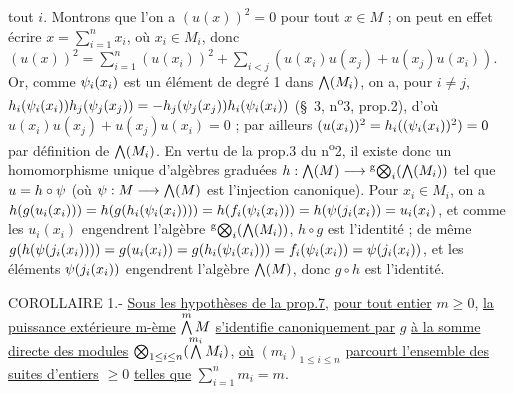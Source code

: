 tout $i$. Montrons que l'on a $(u(x))^2=0$ pour tout $x\in M$ ; on peut en effet écrire $x=\sum_{i=1}^{n}x_i$, où $x_i\in M_i$, donc $(u(x))^2=\sum_{i=1}^{n}(u(x_i))^2+\sum_{i<j}(u(x_i)u(x_j)+u(x_j)u(x_i))$.
Or, comme $\psi_i(x_i)$ est un élément de degré 1 dans $\bigwedge(M_i)$, on a, pour $i\ne j$, $h_i(\psi_i(x_i))h_j(\psi_j(x_j))=-h_j(\psi_j(x_j))h_i(\psi_i(x_i))$ (\S~3, n\textsuperscript{o}3, prop.2), d'où $u(x_i)u(x_j)+u(x_j)u(x_i)=0$ ; par ailleurs $(u(x_i))^2=h_i((\psi_i(x_i))^2)=0$ par définition de $\bigwedge(M_i)$. En vertu de la prop.3 du n\textsuperscript{o}2, il existe donc un homomorphisme unique d'algèbres graduées
$h:\bigwedge(M)\longrightarrow {}^{\mathrm g}\!\bigotimes_i(\bigwedge(M_i))$ tel que $u=h\circ\psi$ (où $\psi:M\longrightarrow\bigwedge(M)$ est l'injection canonique). Pour $x_i\in M_i$, on a
$h(g(u_i(x_i)))=h(g(h_i(\psi_i(x_i))))=h(f_i(\psi_i(x_i)))=h(\psi(j_i(x_i))=u_i(x_i)$, et comme les $u_i(x_i)$ engendrent l'algèbre $ {}^{\mathrm g}\!\bigotimes_i(\bigwedge(M_i))$, $h\circ g$ est l'identité ; de même $g(h(\psi(j_i(x_i))))=g(u_i(x_i))=g(h_i(\psi_i(x_i)))=f_i(\psi_i(x_i))=\psi(j_i(x_i))$, et les éléments $\psi(j_i(x_i))$ engendrent l'algèbre $\bigwedge(M)$, donc $g\circ h$ est l'identité.

COROLLAIRE 1.- \uline{Sous les hypothèses de la prop.7}, \uline{pour tout entier} $m\geq 0$, \uline{la puissance extérieure m-ème} $\overset{m}{\bigwedge}\,M$ \uline{s'identifie canoniquement par} $g$ \uline{à la somme directe des modules} $\bigotimes_{1\leq i\leq n}(\overset{m_i}{\bigwedge}\,M_i)$, \uline{où} $(m_i)_{1\leq i\leq n}$ \uline{parcourt l'ensemble des suites d'entiers} $\geq 0$ \uline{telles que} $\sum_{i=1}^{n}m_i=m$.

